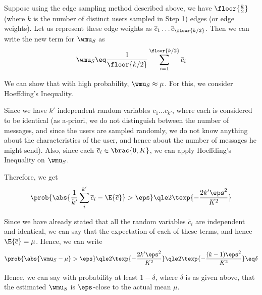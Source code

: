 \documentclass[a4paper,10pt]{article}
\begin{document}
\begin{question}
\begin{qpart}{2}
		Suppose using the edge sampling method described above, we have $\floor{\frac{k}{2}}$ (where $k$ is the number of distinct users sampled in Step 1) edges (or edge weights). Let us represent these edge weights as $\overline{c}_1 \dots \overline{c}_{\floor{k/ 2}}$. Then we can write the new term for $\wmu_S$ as
		\begin{align*}
			\wmu_S	\eq	\frac{1}{\floor{k / 2}} \sum_{i = 1}^{\floor{k / 2}} \overline{c}_i
		\end{align*}

	\end{qpart}

	\begin{qpart}{3}

		We can show that with high probability, $\wmu_S \approx \mu$. For this, we consider Hoeffding's Inequality.


		Since we have $k'$ independent random variables $\overline{c}_1 \dots \overline{c}_{k'}$, where each is considered to be identical (as a-priori, we do not distinguish between the number of messages, and since the users are sampled randomly, we do not know anything about the characteristics of the user, and hence about the number of messages he might send). Also, since each $\overline{c}_i \in \brac{0, K}$, we can apply Hoeffding's Inequality on $\wmu_S$.

		Therefore, we get
		\begin{align*}
		\prob{\abs{\frac{1}{k'} \sum_{i}^{k'} \overline{c}_i - \E{\overline{c}}} > \eps}	\qle	2 \texp{- \frac{2 k' \eps^2}{K^2}}
		\end{align*}

		Since we have already stated that all the random variables $\overline{c}_{i}$ are independent and identical, we can say that the expectation of each of these terms, and hence $\E{\overline{c}} = \mu$. Hence, we can write
		\begin{align*}
			\prob{\abs{\wmu_S - \mu} > \eps}	\qle	2 \texp{- \frac{2 k' \eps^2}{K^2}}	\qle	2 \texp{- \frac{(k - 1) \eps^2}{K^2}}	\eq	\delta
		\end{align*}

		Hence, we can say with probability at least $1 - \delta$, where $\delta$ is as given above, that the estimated $\wmu_S$ is $\eps$-close to the actual mean $\mu$.

	\end{qpart}

\end{question}
\end{document}
